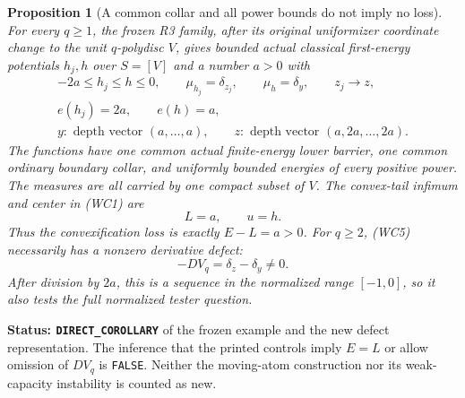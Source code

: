 \documentclass[11pt,a4paper]{article}
\numberwithin{equation}{section}
\newtheorem{proposition}[theorem]{Proposition}
\theoremstyle{definition}
\theoremstyle{remark}
\begin{document}
\begin{proposition}[A common collar and all power bounds do not imply no loss]
\label{prop:r12-frozen-moving-energy-loss}
For every $q\geq1$, the frozen R3 family, after its original
uniformizer coordinate change to the unit $q$-polydisc $V$, gives
bounded actual classical first-energy potentials $h_j,h$ over
$S=[V]$ and a number $a>0$ with
\[
 \begin{gathered}
 -2a\leq h_j\leq h\leq0,\qquad
 \mu_{h_j}=\delta_{z_j},\qquad \mu_h=\delta_y,\qquad
 z_j\longrightarrow z,\\
 e(h_j)=2a,\qquad e(h)=a,\\
 y:\text{ depth vector }(a,\ldots,a),\qquad
 z:\text{ depth vector }(a,2a,\ldots,2a).
 \end{gathered}
 \tag{NL1}
\]
The functions have one common actual finite-energy lower barrier,
one common ordinary boundary collar, and uniformly bounded energies
of every positive power.  The measures are all carried by one compact
subset of $V$.  The convex-tail infimum and center in (WC1) are
\[
                         L=a,\qquad u=h.
 \tag{NL2}
\]
Thus the convexification loss is exactly $E-L=a>0$.
For $q\geq2$, (WC5) necessarily has a nonzero derivative defect:
\[
                      -DV_q=\delta_z-\delta_y\ne0.
 \tag{NL3}
\]
After division by $2a$, this is a sequence in the normalized
range $[-1,0]$, so it also tests the full normalized tester question.
\end{proposition}

\noindent\textbf{Status: \texttt{DIRECT\_COROLLARY}} of the frozen
example and the new defect representation.  The inference that the
printed controls imply $E=L$ or allow omission of $DV_q$ is
\texttt{FALSE}.  Neither the moving-atom construction nor its
weak-capacity instability is counted as new.
\end{document}
